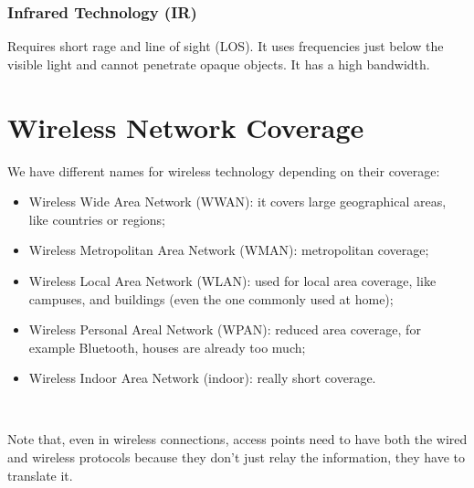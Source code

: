 \subsubsection{Infrared Technology (IR)}
Requires short rage and line of 
sight (LOS). It uses frequencies just below the visible light and cannot 
penetrate opaque objects. It has a high bandwidth.

\section{Wireless Network Coverage}
We have different names for wireless technology depending on their 
coverage:
\begin{itemize}
\item Wireless Wide Area Network (WWAN): it covers large 
  geographical areas, like countries or regions;
\item Wireless Metropolitan Area Network (WMAN): metropolitan 
  coverage;
\item Wireless Local Area Network (WLAN): used for local area 
  coverage, like campuses,  and buildings (even the one commonly used at home);
\item Wireless Personal Areal Network (WPAN): reduced area 
  coverage, for example Bluetooth, houses are already too much;
\item Wireless Indoor Area Network (indoor): really short 
  coverage.
\end{itemize}\

Note that, even in wireless connections, access points need to have both 
the wired and wireless protocols because they don't just relay the information, 
they have to translate it.
